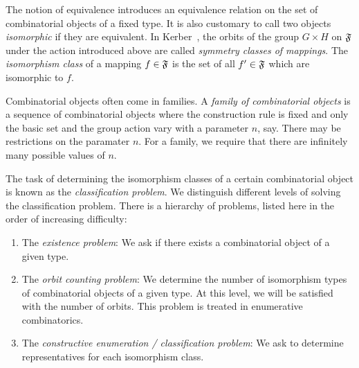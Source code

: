 







\bigskip

The notion of equivalence introduces an 
equivalence relation on the set of combinatorial objects 
of a fixed type.
It is also customary to call two objects {\em isomorphic} if they are equivalent.
In Kerber~\cite{Kerber99}, the orbits of the group $G \times H$ on ${\mathfrak F}$ under the action introduced above 
are called {\em symmetry classes of mappings}.
The {\em isomorphism class} of a mapping $f \in {\mathfrak F}$ is the set 
of all $f' \in {\mathfrak F}$ which are isomorphic to $f$.


\bigskip



Combinatorial objects often come in families.
A {\em family of combinatorial objects} is a sequence 
of combinatorial objects where the construction rule 
is fixed and only the basic set 
and the group action vary with a parameter $n$, say. 
There may be restrictions on the paramater $n$. 
For a family, we require that there are infinitely 
many possible values of $n$. 




\bigskip





The task of determining the isomorphism classes of a certain 
combinatorial object is 
known as the {\em classification problem}.
We distinguish different levels of solving 
the classification problem. 
There is a hierarchy of problems, listed here in the order of increasing difficulty:
\begin{enumerate}
\item
The {\em existence problem}: 
We ask if there exists a combinatorial object 
of a given type. 
\item
The {\em orbit counting problem}:
We determine 
the number of isomorphism types 
of combinatorial objects of a given type.
At this level, we will be satisfied with the number of orbits.
This problem is treated in enumerative combinatorics.
\item
The {\em constructive enumeration / classification problem}: 
We ask to determine representatives for each 
isomorphism class.
\end{enumerate}


